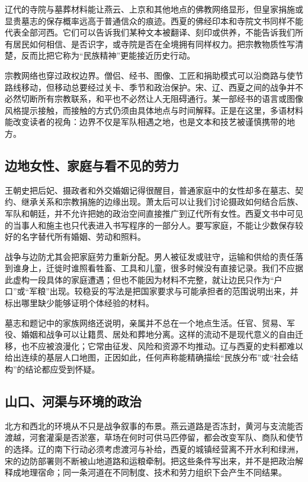 辽代的寺院与墓葬材料能让燕云、上京和其他地点的佛教网络显形，但皇家捐施或显贵墓志的保存概率远高于普通信众的痕迹。西夏的佛经印本和寺院文书同样不能代表全部河西。它们可以告诉我们某种文本被翻译、刻印或供养，不能告诉我们所有居民如何相信、是否识字，或寺院是否在全境拥有同样权力。把宗教物质性写清楚，反而比把它称为“民族精神”更能接近历史行动。

宗教网络也穿过政权边界。僧侣、经书、图像、工匠和捐助模式可以沿商路与使节路线移动，但移动总要经过关卡、季节和政治保护。宋、辽、西夏之间的战争并不必然切断所有宗教联系，和平也不必然让人无阻碍通行。某一部经书的语言或图像风格提示接触，而接触的方式仍须由具体地点与时间解释。正是在这里，多语材料能改变读者的视角：边界不仅是军队相遇之地，也是文本和技艺被谨慎携带的地方。

\subsection{边地女性、家庭与看不见的劳力}

王朝史把后妃、摄政者和外交婚姻记得很醒目，普通家庭中的女性却多在墓志、契约、继承关系和宗教捐施的边缘出现。萧太后可以让我们讨论摄政如何结合后族、军队和朝廷，并不允许把她的政治空间直接推广到辽代所有女性。西夏文书中可见的当事人和施主也只代表进入书写程序的一部分人。要写家庭，不能让少数保存较好的名字替代所有婚姻、劳动和照料。

战争与边防尤其会把家庭劳力重新分配。男人被征发或驻守，运输和供给的责任落到谁身上，迁徙时谁照看牲畜、工具和儿童，很多时候没有直接记录。我们不应据此虚构一段具体的家庭遭遇；但也不能因为材料不完整，就让边民只作为“户口”或“军粮”出现。较稳妥的写法是把国家要求与可能承担者的范围说明出来，并标出哪里缺少能够证明个体经验的材料。

墓志和题记中的家族网络还说明，亲属并不总在一个地点生活。任官、贸易、军役、婚姻和战争可以让籍贯、居处和葬地分离。这样的流动不是现代意义的自由迁移，也不应被浪漫化；它常由征发、风险和资源不均推动。辽与西夏的史料都难以给出连续的基层人口地图，正因如此，任何声称能精确描绘“民族分布”或“社会结构”的结论都应受到怀疑。

\subsection{山口、河渠与环境的政治}

北方和西北的环境从不只是战争叙事的布景。燕云道路是否冻封，黄河与支流能否渡越，河套灌渠是否淤塞，草场在何时可供马匹停留，都会改变军队、商队和使节的选择。辽的南下行动必须考虑渡河与补给，西夏的城镇经营离不开水利和绿洲，宋的边防部署则不断被山地道路和运粮牵制。把这些条件写出来，并不是把政治解释成地理宿命；同一条河道在不同制度、技术和劳力组织下会产生不同结果。

